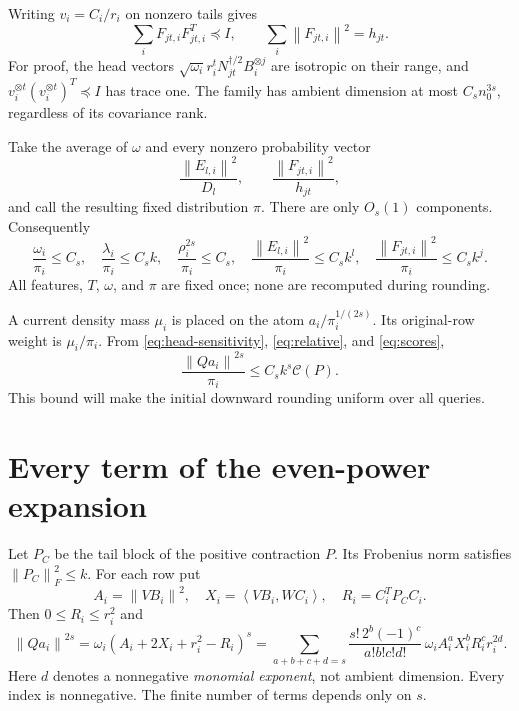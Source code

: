 \documentclass[11pt]{article}
\theoremstyle{remark}\newtheorem{remark}[theorem]{Remark}
\newcommand{\norm}[1]{\left\|#1\right\|}\newcommand{\ip}[2]{\left\langle #1,#2\right\rangle}
\newcommand{\cost}{\mathcal C}\newcommand{\OPT}{\mathsf{OPT}}
\begin{document}
Writing $v_i=C_i/r_i$ on nonzero tails gives
\begin{equation}\label{eq:Fcov}
 \sum_iF_{jt,i}F_{jt,i}^T\preceq I,\qquad
 \sum_i\norm{F_{jt,i}}^2=h_{jt}.
\end{equation}
For proof, the head vectors $\sqrt{\omega_i}r_i^tN_{jt}^{\dagger/2}B_i^{\otimes j}$ are isotropic on their range, and $v_i^{\otimes t}(v_i^{\otimes t})^T\preceq I$ has trace one. The family has ambient dimension at most $C_s n_0^{3s}$, regardless of its covariance rank.

Take the average of $\omega$ and every nonzero probability vector
\begin{equation}\label{eq:pi}
 \frac{\norm{E_{l,i}}^2}{D_l},\qquad
 \frac{\norm{F_{jt,i}}^2}{h_{jt}},
\end{equation}
and call the resulting fixed distribution $\pi$. There are only $O_s(1)$ components. Consequently
\begin{equation}\label{eq:scores}
 \frac{\omega_i}{\pi_i}\le C_s,\quad
 \frac{\lambda_i}{\pi_i}\le C_s k,\quad
 \frac{\rho_i^{2s}}{\pi_i}\le C_s,\quad
 \frac{\norm{E_{l,i}}^2}{\pi_i}\le C_s k^l,\quad
 \frac{\norm{F_{jt,i}}^2}{\pi_i}\le C_s k^j.
\end{equation}
All features, $T$, $\omega$, and $\pi$ are fixed once; none are recomputed during rounding.

A current density mass $\mu_i$ is placed on the atom $a_i/\pi_i^{1/(2s)}$. Its original-row weight is $\mu_i/\pi_i$. From \eqref{eq:head-sensitivity}, \eqref{eq:relative}, and \eqref{eq:scores},
\begin{equation}\label{eq:round-sensitivity}
 \frac{\norm{Qa_i}^{2s}}{\pi_i}\le C_s k^s\cost(P).
\end{equation}
This bound will make the initial downward rounding uniform over all queries.

\section{Every term of the even-power expansion}\label{sec:monomials}
Let $P_C$ be the tail block of the positive contraction $P$. Its Frobenius norm satisfies $\norm{P_C}_F^2\le k$. For each row put
\[
 A_i=\norm{VB_i}^2,\quad X_i=\ip{VB_i}{WC_i},\quad R_i=C_i^TP_CC_i.
\]
Then $0\le R_i\le r_i^2$ and
\begin{equation}\label{eq:expansion}
 \norm{Qa_i}^{2s}=\omega_i(A_i+2X_i+r_i^2-R_i)^s
 =\sum_{a+b+c+d=s}\frac{s!\,2^b(-1)^c}{a!b!c!d!}\,
 \omega_i A_i^aX_i^bR_i^cr_i^{2d}.
\end{equation}
Here $d$ denotes a nonnegative \emph{monomial exponent}, not ambient dimension. Every index is nonnegative. The finite number of terms depends only on $s$.
\end{document}
